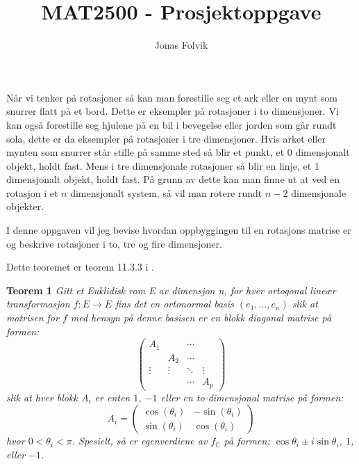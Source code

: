 \documentclass[a4paper,10pt,english]{article}
\title{MAT2500 - Prosjektoppgave}
\author{Jonas Folvik}
\begin{document}
    
    \maketitle

    Når vi tenker på rotasjoner så kan man forestille seg et ark eller en mynt som snurrer flatt på et bord. Dette er eksempler på rotasjoner i to dimensjoner.
    Vi kan også forestille seg hjulene på en bil i bevegelse eller jorden som går rundt sola, dette er da eksempler på rotasjoner i tre dimensjoner.
    Hvis arket eller mynten som snurrer står stille på samme sted så blir et punkt, et 0 dimensjonalt objekt, holdt fast. Mens i tre dimensjonale rotasjoner så blir en linje, et 1 dimensjonalt objekt, holdt fast.
    På grunn av dette kan man finne ut at ved en rotasjon i et $n$ dimensjonalt system, så vil man rotere rundt $n-2$ dimensjonale objekter.

    I denne oppgaven vil jeg bevise hvordan oppbyggingen til en rotasjons matrise er og beskrive rotasjoner i to, tre og fire dimensjoner.

    Dette teoremet er teorem 11.3.3 i \cite{GMA}.

    \textbf{Teorem 1} \textit{Gitt et Euklidisk rom E av dimensjon n, for hver ortogonal lineær transformasjon $f \colon E \rightarrow E$ fins det en ortonormal basis $\left( e_{1}, \dots, e_{n} \right)$
                              slik at matrisen for $f$ med hensyn på denne basisen er en blokk diagonal matrise på formen: 
                              $$
                              \begin{pmatrix}
                                A_{1}  &        & \cdots &        \\
                                       & A_{2}  & \cdots &        \\
                                \vdots & \vdots & \ddots & \vdots \\
                                       &        & \cdots & A_{p}
                              \end{pmatrix}
                              $$
                              slik at hver blokk $A_{i}$ er enten $1$, $-1$ eller en to-dimensjonal matrise på formen:
                              $$ A_{i} = 
                              \begin{pmatrix}
                                \cos(\theta_{i}) & -\sin(\theta_{i}) \\
                                \sin(\theta_{i}) &  \cos(\theta_{i})
                              \end{pmatrix}
                              $$
                              hvor $0 < \theta_{i} < \pi$. Spesielt, så er egenverdiene av $f_{\mathbb{C}}$ på formen: $\cos\theta_{i} \pm i\sin\theta_{i}$, $1$, eller $-1$.} 
\end{document}
